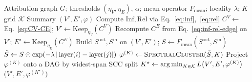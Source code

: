 \begin{algorithm}[h]
\caption{ASG: Inf/Rel pruning + bidirectional spectral clustering}
\label{alg:asg}
\begin{algorithmic}[1]
\REQUIRE Attribution graph $G$; thresholds $(\eta_V, \eta_E)$,
$\alpha$; mean operator $F_{\text{mean}}$; locality $\lambda$;
$K$ grid $\mathcal{K}$
\ENSURE Summary $(V', E', \varphi)$
\STATE Compute $\mathrm{Inf}, \mathrm{Rel}$ via Eq.~\eqref{eq:inf},~\eqref{eq:rel}
\STATE $C^V \gets$ Eq.~\eqref{eq:CV-CE};
       $V' \gets \mathrm{Keep}_{\eta_V}(C^V)$
\STATE Recompute $C^E$ from Eq.~\eqref{eq:inf-rel-edge} on $V'$;
       $E' \gets \mathrm{Keep}_{\eta_E}(C^E)$
\STATE Build $S^{\text{out}}, S^{\text{in}}$ on $(V', E')$;
       $S \gets F_{\text{mean}}(S^{\text{out}}, S^{\text{in}})$
\STATE $\tilde S \gets S \odot \exp(-\lambda\, |\operatorname{layer}(i) - \operatorname{layer}(j)|)$
  \STATE $\varphi^{(K)} \gets \textsc{SpectralCluster}(\tilde S, K)$
  \STATE Project $\varphi^{(K)}$ onto a DAG by widest-span SCC split
\ENDFOR
\STATE $K^\star \gets \operatorname*{arg\,min}_{K \in \mathcal{K}} L\bigl(V', E', \varphi^{(K)}\bigr)$
\RETURN $\bigl(V', E', \varphi^{(K^\star)}\bigr)$
\end{algorithmic}
\end{algorithm}
